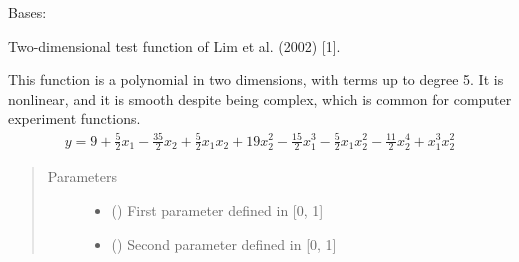 \documentclass[letterpaper,10pt,english,openany,oneside]{sphinxmanual}
\begin{document}
\begin{fulllineitems}
\label{\detokenize{pygpc.testfunctions:pygpc.testfunctions.testfunctions.Lim2002}}
Bases: {\hyperref[\detokenize{pygpc:pygpc.AbstractModel.AbstractModel}]{}}

Two-dimensional test function of Lim et al. (2002) {[}1{]}.

This function is a polynomial in two dimensions, with terms up to degree
5. It is nonlinear, and it is smooth despite being complex, which is
common for computer experiment functions.
\begin{equation*}
\begin{split}y = 9 + \frac{5}{2} x_1 - \frac{35}{2} x_2 + \frac{5}{2} x_1 x_2 + 19 x_2^2 -
\frac{15}{2} x_1^3 - \frac{5}{2} x_1 x_2^2 - \frac{11}{2} x_2^4 + x_1^3 x_2^2\end{split}
\end{equation*}\begin{quote}\begin{description}
\item[{Parameters}] \leavevmode\begin{itemize}
\item {} 
\sphinxstyleliteralstrong{\sphinxupquote{{[}}}\sphinxstyleliteralstrong{\sphinxupquote{{]}}} (\sphinxstyleliteralemphasis{\sphinxupquote{ {[}}}\sphinxstyleliteralemphasis{\sphinxupquote{{]}}}) \textendash{} First parameter defined in {[}0, 1{]}

\item {} 
\sphinxstyleliteralstrong{\sphinxupquote{{[}}}\sphinxstyleliteralstrong{\sphinxupquote{{]}}} (\sphinxstyleliteralemphasis{\sphinxupquote{ {[}}}\sphinxstyleliteralemphasis{\sphinxupquote{{]}}}) \textendash{} Second parameter defined in {[}0, 1{]}


\end{itemize}
\end{description}
\end{quote}
\end{fulllineitems}
\end{document}
